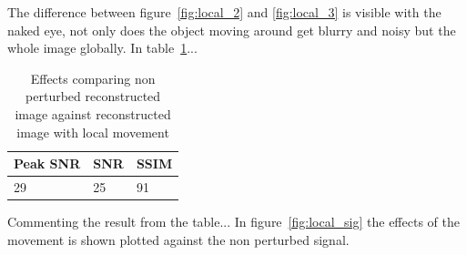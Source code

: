 The difference between figure~\ref{fig:local_2} and \ref{fig:local_3} is visible with the naked eye, not only does the object moving around get blurry and noisy but the whole image globally. In table~\ref{tab:local_dyn}...

\begin{table}[H]
    \centering
  \begin{tabular}{ | l | l | l |}
    \hline
    Peak SNR & SNR & SSIM \\ \hline
    29 & 25 & 91 \\ 
    \hline
  \end{tabular}
      \caption{Effects comparing non perturbed reconstructed image against reconstructed image with local movement}
    \label{tab:local_dyn}
\end{table}

Commenting the result from the table... In figure~\ref{fig:local_sig} the effects of the movement is shown plotted against the non perturbed signal.\\[0.1in]

